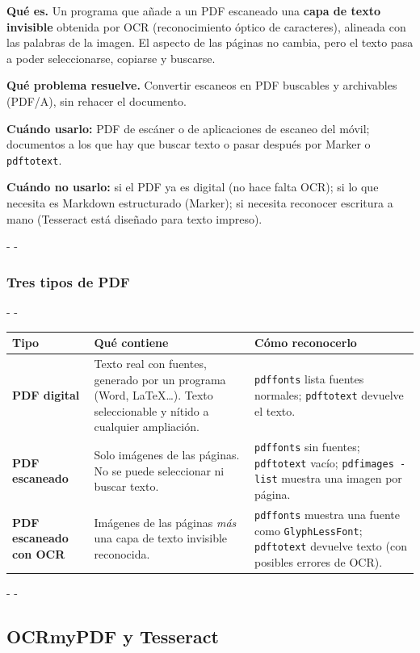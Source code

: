 \documentclass[11pt,a4paper]{article}
\makeatletter
\newcommand{\necesitaespacio}[1]{\par\penalty-100\begingroup
	\setlength{\dimen@}{#1}\dimen@ii\pagegoal\advance\dimen@ii-\pagetotal
	\ifdim\dimen@>\dimen@ii\ifdim\dimen@ii>\z@\vfil\fi\penalty-\@M\fi\endgroup}
\newcommand{\cmd}[1]{\texttt{\textcolor{colcmd}{#1}}}      %
\newcommand{\cab}[1]{\textbf{#1}}
\makeatother
\begin{document}
	\textbf{Qué es.} Un programa que añade a un PDF escaneado una \textbf{capa de texto invisible} obtenida por OCR (reconocimiento óptico de caracteres), alineada con las palabras de la imagen. El aspecto de las páginas no cambia, pero el texto pasa a poder seleccionarse, copiarse y buscarse.
	
	\textbf{Qué problema resuelve.} Convertir escaneos en PDF buscables y archivables (PDF/A), sin rehacer el documento.
	
	\textbf{Cuándo usarlo:} PDF de escáner o de aplicaciones de escaneo del móvil; documentos a los que hay que buscar texto o pasar después por Marker o \cmd{pdftotext}.
	
	\textbf{Cuándo no usarlo:} si el PDF ya es digital (no hace falta OCR); si lo que necesita es Markdown estructurado (Marker); si necesita reconocer escritura a mano (Tesseract está diseñado para texto impreso).
	
	\necesitaespacio{22\baselineskip}
	\subsubsection{Tres tipos de PDF}
	
	\begingroup\small
	\necesitaespacio{18\baselineskip}
	\begin{longtable}{L{3.3cm}L{5.96cm}L{5.8cm}}
		\toprule{}\cab{Tipo} & \cab{Qué contiene} & \cab{Cómo reconocerlo}\\\midrule
		\endfirsthead
		\bottomrule
		\endfoot
		\textbf{PDF digital} & Texto real con fuentes, generado por un programa (Word, LaTeX\ldots). Texto seleccionable y nítido a cualquier ampliación. & \cmd{pdffonts} lista fuentes normales; \cmd{pdftotext} devuelve el texto.\\*
		\textbf{PDF escaneado} & Solo imágenes de las páginas. No se puede seleccionar ni buscar texto. & \cmd{pdffonts} sin fuentes; \cmd{pdftotext} vacío; \cmd{pdfimages -list} muestra una imagen por página.\\*
		\textbf{PDF escaneado con OCR} & Imágenes de las páginas \emph{más} una capa de texto invisible reconocida. & \cmd{pdffonts} muestra una fuente como \texttt{GlyphLessFont}; \cmd{pdftotext} devuelve texto (con posibles errores de OCR).\\
	\end{longtable}
	\endgroup
	
	\necesitaespacio{8\baselineskip}
	\subsection{OCRmyPDF y Tesseract}
	
\end{document}

